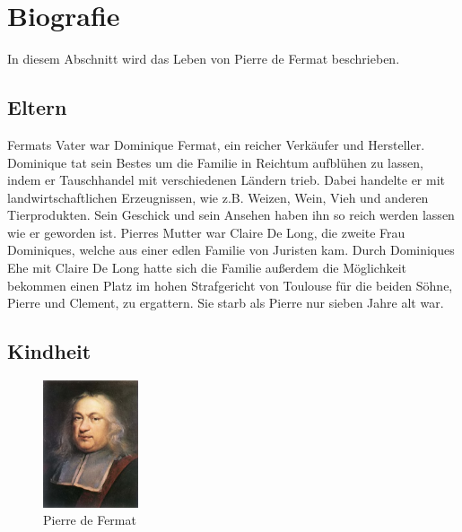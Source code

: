 \section{Biografie} \label{sec:bio}
    In diesem Abschnitt wird das Leben von Pierre de Fermat beschrieben.
    
    \subsection{Eltern} \label{sec:eltern}
        Fermats Vater war Dominique Fermat, ein reicher Verkäufer und Hersteller. Dominique tat sein Bestes um die Familie in Reichtum aufblühen zu lassen, indem er Tauschhandel mit verschiedenen Ländern trieb. Dabei handelte er mit landwirtschaftlichen Erzeugnissen, wie z.B. Weizen, Wein, Vieh und anderen Tierprodukten. Sein Geschick und sein Ansehen haben ihn so reich werden lassen wie er geworden ist. Pierres Mutter war Claire De Long, die zweite Frau Dominiques, welche aus einer edlen Familie von Juristen kam. Durch Dominiques Ehe mit Claire De Long hatte sich die Familie außerdem die Möglichkeit bekommen einen Platz im hohen Strafgericht von Toulouse für die beiden Söhne, Pierre und Clement, zu ergattern. Sie starb als Pierre nur sieben Jahre alt war.
        
    \subsection{Kindheit} \label{sec:kindheit}

        \begin{figure}
            \centering
            \includegraphics[width=0.25\textwidth]{img/Pierre_de_Fermat.jpg}
            \caption{Pierre de Fermat \cite{imgFermat}}
            \label{fig:fermat}
        \end{figure}

